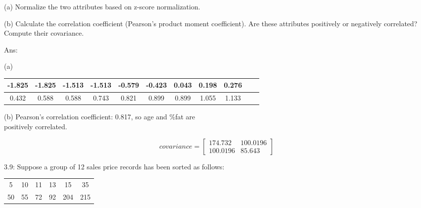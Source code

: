 	\begin{description}

		\item (a) Normalize the two attributes based on z-score normalization.
		\item (b) Calculate the correlation coefficient (Pearson’s product moment coefficient).
		Are these attributes positively or negatively correlated?
		Compute their covariance.

		\vspace{0.5\baselineskip}

		Ans:

		\begin{description}
			\item (a)
		\end{description}

		\begin{center}
		\begin{tabular}{ |c|c|c|c|c|c|c|c|c|c|c| }
			\hline
			-1.825 & -1.825 & -1.513 & -1.513 & -0.579 & -0.423 & 0.043 & 0.198 & 0.276 \\
			\hline
			0.432 & 0.588 & 0.588 & 0.743 & 0.821 & 0.899 & 0.899 & 1.055 & 1.133 \\
			\hline
		\end{tabular}
		\end{center}
			
		\begin{description}
		
			\item (b)
			Pearson’s correlation coefficient: 0.817, so age and \%fat are \\ positively correlated.
		
		\end{description}
		
		$$
		covariance = 
		\begin{bmatrix}
			174.732 & 100.0196 \\
			100.0196 & 85.643
		\end{bmatrix}
		$$
		
	\end{description}

	\clearpage

	3.9: Suppose a group of 12 sales price records has been sorted as follows:

	\vspace{0.5\baselineskip}

	\begin{center}
	\begin{tabular}{ |c|c|c|c|c|c| } 
	\hline

	5 & 10 & 11 & 13 & 15 & 35 \\ 
	50 & 55 & 72 & 92 & 204 & 215 \\

	\hline
	\end{tabular}
	\end{center}

